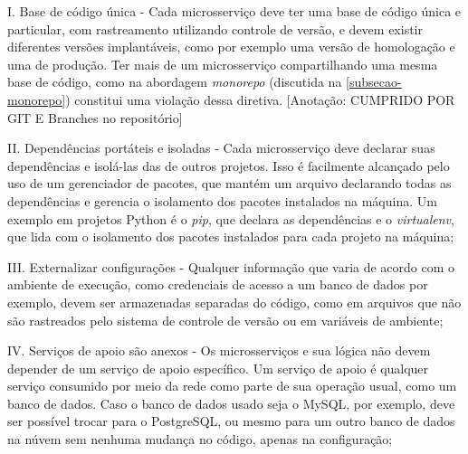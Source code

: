 


I. Base de código única - Cada microsserviço deve ter uma base de código única e particular, com rastreamento utilizando controle de versão, e devem existir diferentes versões implantáveis, como por exemplo uma versão de homologação e uma de produção. Ter mais de um microsserviço compartilhando uma mesma base de código, como na abordagem \emph{monorepo} (discutida na \autoref{subsecao-monorepo}) constitui uma violação dessa diretiva. [Anotação: CUMPRIDO POR GIT E Branches no repositório]

II. Dependências portáteis e isoladas - Cada microsserviço deve declarar suas dependências e isolá-las das de outros projetos. Isso é facilmente alcançado pelo uso de um gerenciador de pacotes, que mantém um arquivo declarando todas as dependências e gerencia o isolamento dos pacotes instalados na máquina. Um exemplo em projetos Python é o \emph{pip}, que declara as dependências e o \emph{virtualenv}, que lida com o isolamento dos pacotes instalados para cada projeto na máquina;

III. Externalizar configurações - Qualquer informação que varia de acordo com o ambiente de execução, como credenciais de acesso a um banco de dados por exemplo, devem ser armazenadas separadas do código, como em arquivos que não são rastreados pelo sistema de controle de versão ou em variáveis de ambiente;

IV. Serviços de apoio são anexos - Os microsserviços e sua lógica não devem depender de um serviço de apoio específico. Um serviço de apoio é qualquer serviço consumido por meio da rede como parte de sua operação usual, como um banco de dados. Caso o banco de dados usado seja o MySQL, por exemplo, deve ser possível trocar para o PostgreSQL, ou mesmo para um outro banco de dados na núvem sem nenhuma mudança no código, apenas na configuração;

